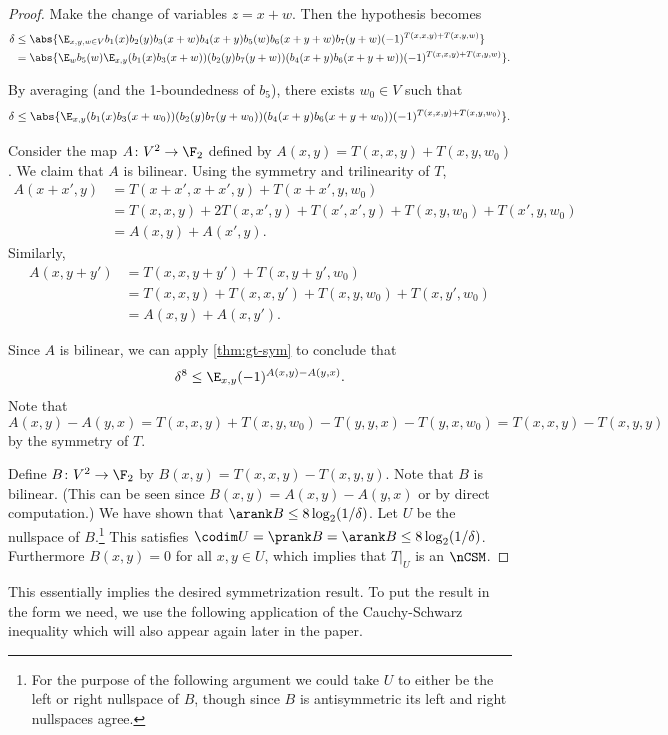 \begin{proof}
Make the change of variables $z=x+w$. Then the hypothesis becomes
\begin{align*}
\delta
&\leq\abs{\E_{x,y,w\in V}b_1(x)b_2(y)b_3(x+w)b_4(x+y)b_5(w)b_6(x+y+w)b_7(y+w)(-1)^{T(x,x,y)+T(x,y,w)}}\\
&=\abs{\E_w b_5(w)\E_{x,y}(b_1(x)b_3(x+w))(b_2(y)b_7(y+w))(b_4(x+y)b_6(x+y+w))(-1)^{T(x,x,y)+T(x,y,w)}}.
\end{align*}

By averaging (and the 1-boundedness of $b_5$), there exists $w_0\in V$ such that \[\delta\leq\abs{\E_{x,y}(b_1(x)b_3(x+w_0))(b_2(y)b_7(y+w_0))(b_4(x+y)b_6(x+y+w_0))(-1)^{T(x,x,y)+T(x,y,w_0)}}.\]

Consider the map $A\colon V^2\to\F_2$ defined by $A(x,y)=T(x,x,y)+T(x,y,w_0)$. We claim that $A$ is bilinear. Using the symmetry and trilinearity of $T$,
\begin{align*}
A(x+x',y)
&=T(x+x',x+x',y)+T(x+x',y,w_0)\\
&=T(x,x,y)+2T(x,x',y)+T(x',x',y)+T(x,y,w_0)+T(x',y,w_0)\\
&=A(x,y)+A(x',y).
\end{align*}
Similarly,
\begin{align*}
A(x,y+y')
&=T(x,x,y+y')+T(x,y+y',w_0)\\
&=T(x,x,y)+T(x,x,y')+T(x,y,w_0)+T(x,y',w_0)\\
&=A(x,y)+A(x,y').
\end{align*}

Since $A$ is bilinear, we can apply \cref{thm:gt-sym} to conclude that 
\[\delta^8\leq\E_{x,y}(-1)^{A(x,y)-A(y,x)}.\] Note that 
\[A(x,y)-A(y,x)=T(x,x,y)+T(x,y,w_0)-T(y,y,x)-T(y,x,w_0)=T(x,x,y)-T(x,y,y)\] by the symmetry of $T$.

Define $B\colon V^2\to\F_2$ by $B(x,y)=T(x,x,y)-T(x,y,y)$. Note that $B$ is bilinear. (This can be seen since $B(x,y)=A(x,y)-A(y,x)$ or by direct computation.) We have shown that $\arank B\leq 8\log_2(1/\delta)$. Let $U$ be the nullspace of $B$.\footnote{For the purpose of the following argument we could take $U$ to either be the left or right nullspace of $B$, though since $B$ is antisymmetric its left and right nullspaces agree.} This satisfies $\codim U=\prank B=\arank B\leq 8\log_2 (1/\delta)$. Furthermore $B(x,y)=0$ for all $x,y\in U$, which implies that $T|_U$ is an $\nCSM$.
\end{proof}

This essentially implies the desired symmetrization result. To put the result in the form we need, we use the following application of the Cauchy-Schwarz inequality which will also appear again later in the paper.

